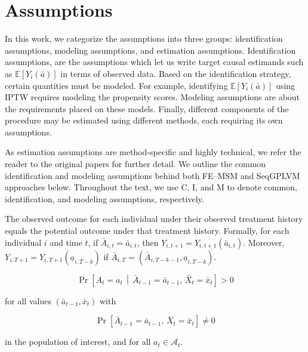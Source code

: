 \section{Assumptions}
\label{sec:assumptions}
In this work, we categorize the assumptions into three groups: identification assumptions, 
modeling assumptions, and estimation assumptions. Identification assumptions, 
are the assumptions which let us write target causal estimands such as 
$\mathbb{E}[Y_i(\bar{a})]$ in terms of observed data. 
Based on the identification strategy, certain quantities must be modeled. 
For example, identifying $\mathbb{E}[Y_i(\bar{a})]$ using IPTW requires 
modeling the propensity scores. Modeling assumptions are about the 
requirements placed on these models. Finally, 
different components of the procedure may be estimated using different methods, each requiring its own assumptions.

As estimation assumptions are method-specific and highly technical, 
we refer the reader to the original papers for further detail. 
We outline the common identification and modeling assumptions 
behind both FE--MSM and SeqGPLVM approaches below. Throughout the text, 
we use C, I, and M to denote common, identification, and modeling 
assumptions, respectively.

\begin{assumpC}[Consistency]\label{ass:C-consistency}
The observed outcome for each individual under their observed treatment history equals
the potential outcome under that treatment history. Formally, for each individual $i$
and time $t$, if $\bar{A}_{i,t}=\bar{a}_{i,t}$, then $Y_{i,t+1}=Y_{i,t+1}(\bar{a}_{i,t})$. 
Moreover, $Y_{i,T+1} = Y_{i,T+1}(\underline{a}_{i,T-k})$ if 
$\bar{A}_{i,T}=\left(\bar{A}_{i,T-k-1},\underline{a}_{i,T-k}\right)$.
\end{assumpC}

\begin{assumpC}[Positivity]\label{ass:C-positivity}
\[
\Pr\!\left[ A_t = a_t \,\middle|\, 
\bar{A}_{t-1} = \bar{a}_{t-1},\,
\bar{X}_t = \bar{x}_t \right] > 0
\]

for all values $(\bar{a}_{t-1}, \bar{x}_t)$ with

\[
\Pr\!\left[ \bar{A}_{t-1} = \bar{a}_{t-1},\,
\bar{X}_t = \bar{x}_t \right] \neq 0
\]

in the population of interest, and for all $a_t \in \mathcal{A}_t$.
\end{assumpC}

